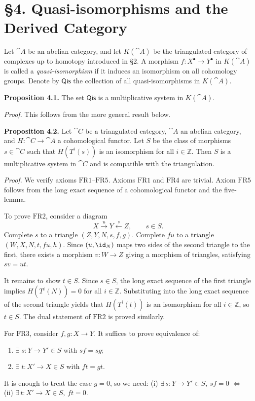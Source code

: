 \setcounter{page}{35}
\section{\S4. Quasi-isomorphisms and the Derived Category}

Let \(\cat{A}\) be an abelian category, and let \(K(\cat{A})\) be the triangulated category of complexes up to homotopy introduced in \S2. A morphism \(f\colon X^\bullet\to Y^\bullet\) in \(K(\cat{A})\) is called a \textit{quasi-isomorphism} if it induces an isomorphism on all cohomology groups. Denote by \(\mathsf{Qis}\) the collection of all quasi-isomorphisms in \(K(\cat{A})\).

\medskip
\textbf{Proposition 4.1.}
The set \(\mathsf{Qis}\) is a multiplicative system in \(K(\cat{A})\).

\textit{Proof.} This follows from the more general result below.

\medskip
\textbf{Proposition 4.2.}
Let \(\cat{C}\) be a triangulated category, \(\cat{A}\) an abelian category, and \(H\colon\cat{C}\to\cat{A}\) a cohomological functor. Let \(S\) be the class of morphisms \(s\in\cat{C}\) such that \(H(T^i(s))\) is an isomorphism for all \(i\in\mathbb{Z}\). Then \(S\) is a multiplicative system in \(\cat{C}\) and is compatible with the triangulation.

\textit{Proof.} We verify axioms \(\text{FR1}\)--\(\text{FR5}\). Axioms \(\text{FR1}\) and \(\text{FR4}\) are trivial. Axiom \(\text{FR5}\) follows from the long exact sequence of a cohomological functor and the five-lemma.

\setcounter{page}{36}
To prove \(\text{FR2}\), consider a diagram
\[
X\xrightarrow{u} Y \xleftarrow{s} Z,\qquad s\in S.
\]
Complete \(s\) to a triangle \((Z,Y,N,s,f,g)\). Complete \(fu\) to a triangle \((W,X,N,t,fu,h)\). Since \((u,\id_N)\) maps two sides of the second triangle to the first, there exists a morphism \(v\colon W\to Z\) giving a morphism of triangles, satisfying \(sv = ut\).

It remains to show \(t\in S\). Since \(s\in S\), the long exact sequence of the first triangle implies \(H(T^i(N))=0\) for all \(i\in\mathbb{Z}\). Substituting into the long exact sequence of the second triangle yields that \(H(T^i(t))\) is an isomorphism for all \(i\in\mathbb{Z}\), so \(t\in S\). The dual statement of \(\text{FR2}\) is proved similarly.

\setcounter{page}{37}
For \(\text{FR3}\), consider \(f,g\colon X\to Y\). It suffices to prove equivalence of:
\begin{enumerate}
\item[(i)] \(\exists\;s\colon Y\to Y'\in S\) with \(sf=sg\);
\item[(ii)] \(\exists\;t\colon X'\to X\in S\) with \(ft=gt\).
\end{enumerate}
It is enough to treat the case \(g=0\), so we need:
(i) \(\exists\,s\colon Y\to Y'\in S,\ sf=0\)
\(\iff\)
(ii) \(\exists\,t\colon X'\to X\in S,\ ft=0\).

